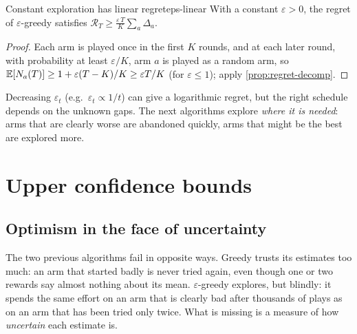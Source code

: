 \begin{proposition}{Constant exploration has linear regret}{eps-linear}
  With a constant $\varepsilon > 0$, the regret of $\varepsilon$-greedy
  satisfies $\mathcal{R}_T \geq \frac{\varepsilon\, T}{K} \sum_a
  \Delta_a$.
\end{proposition}

\begin{proof}
  Each arm is played once in the first $K$ rounds, and at each later
  round, with probability at least $\varepsilon / K$, arm $a$ is played as
  a random arm, so $\mathbb{E}[N_a(T)] \geq 1 + \varepsilon (T - K) / K \geq
  \varepsilon T / K$ (for $\varepsilon \leq 1$); apply
  \cref{prop:regret-decomp}.
\end{proof}

Decreasing $\varepsilon_t$ (e.g.\ $\varepsilon_t \propto 1/t$) can give a
logarithmic regret, but the right schedule depends on the unknown gaps.
The next algorithms explore \emph{where it is needed}: arms that are
clearly worse are abandoned quickly, arms that might be the best are
explored more.

\section{Upper confidence bounds}

\subsection{Optimism in the face of uncertainty}

The two previous algorithms fail in opposite ways. Greedy trusts its
estimates too much: an arm that started badly is never tried again, even
though one or two rewards say almost nothing about its mean.
$\varepsilon$-greedy explores, but blindly: it spends the same effort on an
arm that is clearly bad after thousands of plays as on an arm that has been
tried only twice. What is missing is a measure of how \emph{uncertain}
each estimate is.

